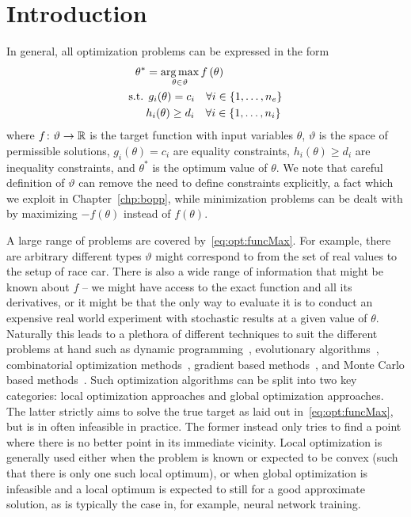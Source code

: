 
\section{Introduction}
\label{sec:opt:intro}

In general, all optimization problems can be expressed in the form
\begin{align}
	\begin{split}
	\label{eq:opt:funcMax}
	\theta^* &= \operatorname*{arg\,max}_{\theta \in \vartheta} f\left(\theta\right) \\
	\text{s.t.} \: & \: g_i(\theta) = c_i \quad \forall i \in \{1,\dots,n_e\} \\
		 & h_i(\theta) \ge d_i \quad \forall i \in \{1,\dots,n_i\}
	\end{split}
\end{align}
where $f \colon \vartheta \rightarrow \mathbb{R}$ is the target function with input
variables $\theta$, $\vartheta$ is the space of permissible solutions, 
$g_i(\theta) = c_i$ are equality constraints, $h_i(\theta) \ge d_i$ are
inequality constraints, and $\theta^*$ is the optimum value of $\theta$.
We note that careful definition of $\vartheta$ can remove the need to
define constraints explicitly, a fact which we exploit in Chapter~\ref{chp:bopp},
while minimization problems can be dealt with by maximizing $-f\left(\theta\right)$
instead of $f\left(\theta\right)$.

A large range of problems are covered by~\eqref{eq:opt:funcMax}.  For example, 
there are arbitrary different types $\vartheta$ might correspond to from the set of real
values to the setup of race car.  There is also a wide range of information that might
be known about $f$ -- we might have access to the exact function and all its derivatives,
or it might be that the only way to evaluate it is to conduct an expensive real world 
experiment with stochastic results at a given value of $\theta$.  Naturally this leads 
to a plethora of different techniques to suit the different problems at hand such
as dynamic programming~\citep{bellman2013dynamic}, evolutionary 
algorithms~\citep{back1996evolutionary}, combinatorial optimization 
methods~\citep{papadimitriou1982combinatorial}, gradient based 
methods~\citep{boyd2004convex}, and Monte Carlo based methods~\citep{robert2004monte}.
Such optimization algorithms can be split into two key categories:
local optimization approaches and global optimization approaches.  
The latter strictly aims to solve the true target as laid out in~\eqref{eq:opt:funcMax}, but
is in often infeasible in practice.
The former instead only tries to find a point where there is no better point in its immediate vicinity. 
Local optimization is generally
used either when the problem is known or expected to be convex (such that there is only
one such local optimum), or when global optimization is infeasible and a local
optimum is expected to still for a good approximate solution, as is typically the case in,
for example, neural network training.

